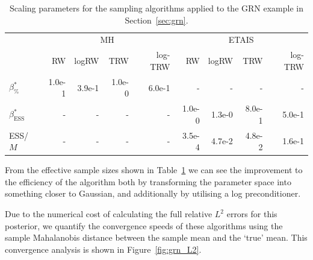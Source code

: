 \documentclass[final]{siamltex}
\begin{document}
\begin{table}[!h]
	\centering
	\begin{tabular}{lrrrrrrrr}
	\toprule
		 & \multicolumn{4}{c}{MH} & \multicolumn{4}{c}{ETAIS} \\ \cmidrule(lr){2-5} \cmidrule(lr){6-9}
		& RW & logRW & TRW & log-TRW & RW & logRW & TRW & log-TRW \\ \midrule
		$\beta_{\%}^*$	 	& 1.0e-1 & 3.9e-1 & 1.0e-0 &6.0e-1 & - & - & - & - \\
		$\beta_{\text{ESS}}^*$	& - 	        & -           & -            & -            & 1.0e-0 & 1.3e-0 & 8.0e-1 & 5.0e-1 \\
		ESS/$M$		 		& - 	        & -           & -            & -            & 3.5e-4 & 4.7e-2 & 4.8e-2 & 1.6e-1  \\
	\bottomrule
	\end{tabular}
	\caption{Scaling parameters for the sampling algorithms applied to the GRN example in Section~\ref{sec:grn}.}
	\label{tab:grn_scaling_parameters}
\end{table}

From the effective sample sizes shown in
Table~\ref{tab:grn_scaling_parameters} we can see the improvement to
the efficiency of the algorithm both by transforming the parameter
space into something closer to Gaussian, and additionally by utilising
a log preconditioner.

Due to the numerical cost of calculating the full relative $L^2$ errors for this posterior, we quantify the convergence speeds of these algorithms using the sample Mahalanobis distance between the sample mean and the `true' mean. This convergence analysis is shown in Figure~\ref{fig:grn_L2}.
\end{document}
